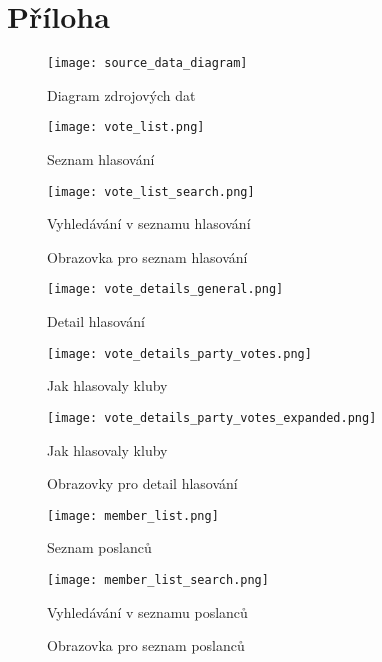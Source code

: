 \chapter{Příloha}

\begin{figure}
	\texttt{[image: source\_data\_diagram]}
	\caption{Diagram zdrojových dat}
	\label{fig:class-diagram}
\end{figure}

\begin{figure}[h]
	\begin{minipage}{0.5\textwidth}
		\centering
		\texttt{[image: vote\_list.png]}
		\caption{Seznam hlasování}
		\label{fig:vote_list}
	\end{minipage}%
	\begin{minipage}{0.5\textwidth}
		\centering
		\texttt{[image: vote\_list\_search.png]}
		\caption{Vyhledávání v seznamu hlasování}
		\label{fig:vote_list_search}
	\end{minipage}
	\caption{Obrazovka pro seznam hlasování}
\end{figure}

\begin{figure}[h]
	\begin{minipage}{0.5\textwidth}
		\centering
		\texttt{[image: vote\_details\_general.png]}
		\caption{Detail hlasování}
		\label{fig:vote_details_general}
	\end{minipage}%
	\begin{minipage}{0.5\textwidth}
		\centering
		\texttt{[image: vote\_details\_party\_votes.png]}
		\caption{Jak hlasovaly kluby}
		\label{fig:vote_details_party_votes}
	\end{minipage}
	\begin{minipage}{0.5\textwidth}
	\centering
	\texttt{[image: vote\_details\_party\_votes\_expanded.png]}
	\caption{Jak hlasovaly kluby}
	\label{fig:vote_details_party_votes_expanded}
\end{minipage}
	\caption{Obrazovky pro detail hlasování}
\end{figure}

\begin{figure}[h]
	\begin{minipage}{0.5\textwidth}
		\centering
		\texttt{[image: member\_list.png]}
		\caption{Seznam poslanců}
		\label{fig:member_list}
	\end{minipage}%
	\begin{minipage}{0.5\textwidth}
		\centering
		\texttt{[image: member\_list\_search.png]}
		\caption{Vyhledávání v seznamu poslanců}
		\label{fig:member_list_search}
	\end{minipage}
	\caption{Obrazovka pro seznam poslanců}
\end{figure}

